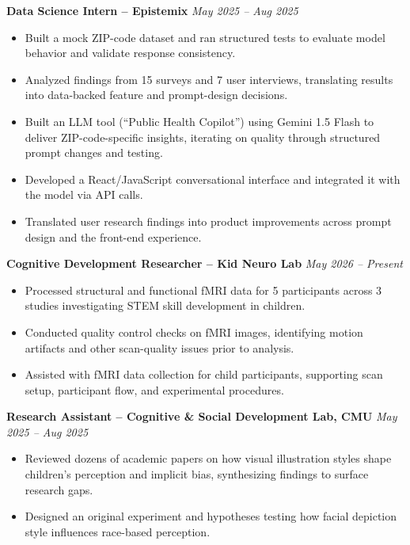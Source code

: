 \documentclass[10.5pt]{article}
\begin{document}
\noindent\textbf{Data Science Intern – Epistemix} \hfill \textit{May 2025 – Aug 2025}\\[-1.3em]
\begin{itemize}
  \item Built a mock ZIP-code dataset and ran structured tests to evaluate model behavior and validate response consistency.
  \item Analyzed findings from 15 surveys and 7 user interviews, translating results into data-backed feature and prompt-design decisions.
  \item Built an LLM tool (``Public Health Copilot'') using Gemini 1.5 Flash to deliver ZIP-code-specific insights, iterating on quality through structured prompt changes and testing.
  \item Developed a React/JavaScript conversational interface and integrated it with the model via API calls.
  \item Translated user research findings into product improvements across prompt design and the front-end experience.
\end{itemize}

\noindent\textbf{Cognitive Development Researcher -- Kid Neuro Lab} \hfill
\textit{May 2026 -- Present}\\[-1.3em]
\begin{itemize}
  \item Processed structural and functional fMRI data for 5 participants across 3 studies investigating STEM skill development in children.
  \item Conducted quality control checks on fMRI images, identifying motion artifacts and other scan-quality issues prior to analysis.
  \item Assisted with fMRI data collection for child participants, supporting scan setup, participant flow, and experimental procedures.
\end{itemize}

\noindent\textbf{Research Assistant – Cognitive \& Social Development Lab, CMU} \hfill \textit{May 2025 – Aug 2025}\\[-1.3em]
\begin{itemize}
  \item Reviewed dozens of academic papers on how visual illustration styles shape children's perception and implicit bias, synthesizing findings to surface research gaps.
  \item Designed an original experiment and hypotheses testing how facial depiction style influences race-based perception.
\end{itemize}
\end{document}
